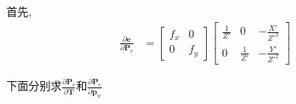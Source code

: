 \documentclass{article}
\begin{document}
首先,
\begin{equation}
	\begin{aligned}
		\frac{\partial{\boldsymbol{e}}}{\partial{\boldsymbol{P}_c}} & =
		\left[
		\begin{matrix}
		f_x & 0 \\
		0 & f_y 
		\end{matrix}
		\right]
		\left[ 
		\begin{matrix}
		\frac{1}{Z'} & 0            & -\frac{X'}{Z'^2} \\
		0            & \frac{1}{Z'} & -\frac{Y'}{Z'^2} 
		\end{matrix}
		\right] 
	\end{aligned} 
\end{equation}

下面分别求$\frac{\partial{\boldsymbol{P}_c}}{\partial{\boldsymbol{T}}}$和$\frac{\partial{\boldsymbol{P}_c}}{\partial{\boldsymbol{p}_w}}$
\end{document}
